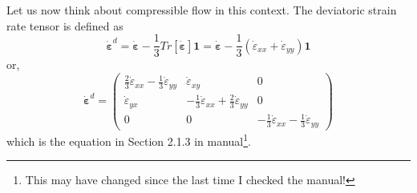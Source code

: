 Let us now think about compressible flow in this context. 
The deviatoric strain rate tensor is defined as 
\[
\dot{\bm \varepsilon}^d 
= \dot{\bm \varepsilon} -\frac{1}{3} Tr[\dot{\bm \varepsilon}]   {\bm 1} 
= \dot{\bm \varepsilon} -\frac{1}{3} (\dot{\varepsilon}_{xx} +\dot{\varepsilon}_{yy}   )  {\bm 1} 
\]
or,
\[
\dot{\bm \varepsilon}^d = 
\left(
\begin{array}{ccc}
\frac{2}{3}\dot{\varepsilon}_{xx} -\frac{1}{3}\dot{\varepsilon}_{yy} & \dot{\varepsilon}_{xy} & 0 \\
\dot{\varepsilon}_{yx} & -\frac{1}{3}\dot{\varepsilon}_{xx} +\frac{2}{3} \dot{\varepsilon}_{yy} & 0 \\
0 & 0 & -\frac{1}{3} \dot{\varepsilon}_{xx} -\frac{1}{3}\dot{\varepsilon}_{yy}
\end{array}
\right)
\]
which is the equation in Section 2.1.3 in \aspect{} manual\footnote{This may have changed since 
the last time I checked the manual!}. 

